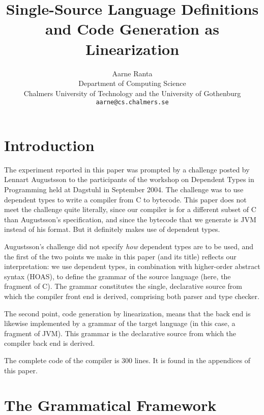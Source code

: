 \documentclass[12pt]{article}
\title{{\bf Single-Source Language Definitions and Code Generation as Linearization}}
\author{Aarne Ranta \\
  Department of Computing Science \\
  Chalmers University of Technology and the University of Gothenburg\\
  {\tt aarne@cs.chalmers.se}}
\begin{document}
\maketitle


\section{Introduction}

The experiment reported in this paper was prompted by a challenge
posted by Lennart Augustsson to the participants of the workshop
on Dependent Types in Programming held at Dagstuhl in September 2004.
The challenge was to use dependent types to write a compiler from
C to bytecode. This paper does not meet the challenge quite literally,
since our compiler is for a different subset of C than Augustsson's
specification, and since the bytecode that we generate is JVM instead
of his format. But it definitely makes use of dependent types.

Augustsson's  challenge did not specify \textit{how} dependent
types are to be used, and the first of the two points we make in this
paper (and its title) reflects our interpretation:
we use dependent types, in combination with higher-order abstract syntax (HOAS),
to define the grammar of the source language (here, the fragment of C).
The grammar constitutes the single, declarative source from which
the compiler front end is derived, comprising both parser and type
checker.

The second point, code generation by linearization, means that the
back end is likewise implemented by a grammar of the target
language (in this case, a fragment of JVM). This grammar is the
declarative source from which the compiler back end is derived.

The complete code of the compiler is 300 lines. It is found in 
the appendices of this paper.



\section{The Grammatical Framework}
\end{document}
